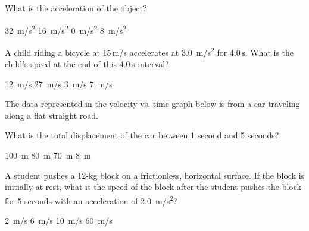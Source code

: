 \documentclass[]{exam}
\begin{document}
\begin{questions}
What is the acceleration of the object?

\begin{randomizechoices}
 \choice \SI{32}{m/s^2}
 \choice \SI{16}{m/s^2}
 \correctchoice \SI{0}{m/s^2}
 \choice \SI{8}{m/s^2}
\end{randomizechoices}

\question 
A child riding a bicycle at 15\,m/s accelerates at \SI{3.0}{m/s^2} for 4.0\,s. What is the child's speed at the end of this 4.0\,s
interval?

\begin{randomizechoices}
    \choice \SI{12}{m/s}
    \correctchoice \SI{27}{m/s}
    \choice \SI{3}{m/s}
    \choice \SI{7}{m/s}
\end{randomizechoices}

\ifprintanswers \else \clearpage \fi

\question
The data represented in the velocity vs. time graph below is from a car traveling along a flat straight road.

\begin{center}
\end{center}

What is the total displacement of the car between 1 second and 5 seconds?

\begin{randomizechoices}
    \choice \SI{100}{m}
    \correctchoice \SI{80}{m}
    \choice \SI{70}{m}
    \choice \SI{8}{m}
\end{randomizechoices}

\question
A student pushes a 12-kg block on a frictionless, horizontal surface. If the block is initially at rest, what is the speed of
the block after the student pushes the block for 5 seconds with an acceleration of \SI{2.0}{m/s^2}?

\begin{randomizechoices}
    \choice \SI{2}{m/s}
    \choice \SI{6}{m/s}
    \correctchoice \SI{10}{m/s}
    \choice \SI{60}{m/s}
\end{randomizechoices}


\end{questions}
\end{document}
